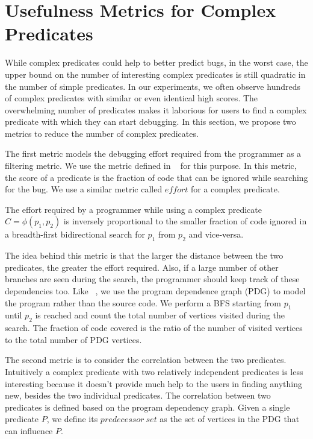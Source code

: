 \section{Usefulness Metrics for Complex Predicates}
\label{sec-metrics}
While complex predicates could help to better predict bugs, in the worst case, the upper bound on the number of interesting complex predicates is still quadratic in the number of simple predicates.  In our experiments, we often observe hundreds of complex predicates with similar or even identical high scores.  The overwhelming number of predicates makes it laborious for users to find a complex predicate with which they can start debugging.  In this section, we propose two metrics to reduce the number of complex predicates.

The first metric models the debugging effort required from the programmer as a filtering metric.  We use the metric defined in ~\cite{1062522} for this purpose.  In this metric, the score of a predicate is the fraction of code that can be ignored while searching for the bug.  We use a similar metric called $effort$ for a complex predicate.

\begin{defn}
\label{dfn4}
The effort required by a programmer while using a complex predicate $C = \phi(p_1, p_2)$ is inversely proportional to the smaller fraction of code ignored in a breadth-first bidirectional search for $p_1$ from $p_2$ and vice-versa.
\end{defn}

The idea behind this metric is that the larger the distance between the two predicates, the greater the effort required.  Also, if a large number of other branches are seen during the search, the programmer should keep track of these dependencies too.  Like ~\cite{1062522}, we use the program dependence graph (PDG) to model the program rather than the source code. We perform a BFS starting from $p_1$ until $p_2$ is reached and count the total number of vertices visited during the search. The fraction of code covered is the ratio of the number of visited vertices to the total number of PDG vertices. 

The second metric is to consider the correlation between the two predicates.  Intuitively a complex predicate with two relatively independent predicates is less interesting because it doesn't provide much help to the users in finding anything new, besides the two individual predicates.  The correlation between two predicates is defined based on the program dependency graph.  Given a single predicate $P$, we define its $predecessor\ set$ as the set of vertices in the PDG that can influence $P$.

